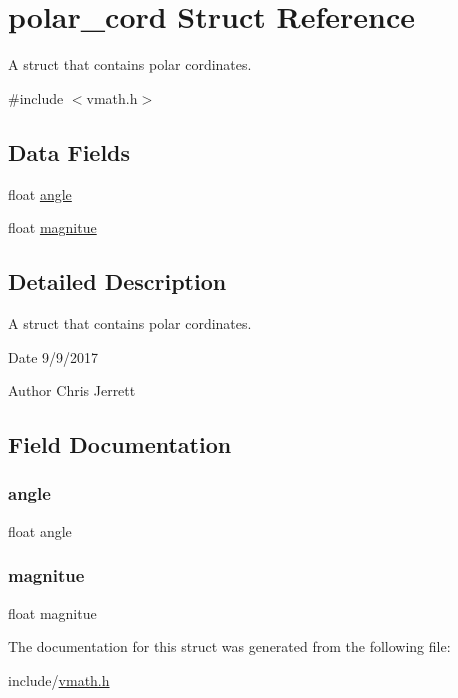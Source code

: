\hypertarget{structpolar__cord}{}\section{polar\+\_\+cord Struct Reference}
\label{structpolar__cord}


A struct that contains polar cordinates.  




{\ttfamily \#include $<$vmath.\+h$>$}

\subsection*{Data Fields}
\begin{DoxyCompactItemize}
\item 
float \hyperlink{structpolar__cord_ab8ef1bf8a70cc07c6d55823c390a7e76}{angle}
\item 
float \hyperlink{structpolar__cord_a16ebe6028d7fa6cbd5cd673819eecb9f}{magnitue}
\end{DoxyCompactItemize}


\subsection{Detailed Description}
A struct that contains polar cordinates. 

\begin{DoxyDate}{Date}
9/9/2017 
\end{DoxyDate}
\begin{DoxyAuthor}{Author}
Chris Jerrett 
\end{DoxyAuthor}


\subsection{Field Documentation}
\mbox{\label{structpolar__cord_ab8ef1bf8a70cc07c6d55823c390a7e76}} 
\subsubsection{\texorpdfstring{angle}{angle}}
{\footnotesize\ttfamily float angle}

\mbox{\label{structpolar__cord_a16ebe6028d7fa6cbd5cd673819eecb9f}} 
\subsubsection{\texorpdfstring{magnitue}{magnitue}}
{\footnotesize\ttfamily float magnitue}



The documentation for this struct was generated from the following file\+:\begin{DoxyCompactItemize}
\item 
include/\hyperlink{vmath_8h}{vmath.\+h}\end{DoxyCompactItemize}
